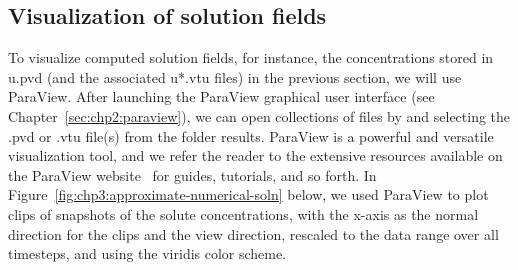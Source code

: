 \subsection{Visualization of solution fields}
To visualize computed solution fields, for instance, the
concentrations stored in u.pvd (and the associated u*.vtu files) in
the previous section, we will use ParaView. After launching the
ParaView graphical user interface (see
Chapter~\ref{sec:chp2:paraview}), we can open collections of files
by  and selecting the .pvd or .vtu
file(s) from the folder results. ParaView is a powerful and versatile 
visualization tool, and we refer the reader to the extensive resources 
available on the ParaView website~\cite{paraview:web} for guides, tutorials, 
and so forth. In Figure~\ref{fig:chp3:approximate-numerical-soln} below, we 
used ParaView to plot clips of snapshots of the solute
concentrations, with the x-axis as the normal direction for the clips
and the view direction, rescaled to the data range over all
  timesteps, and using the viridis color scheme.
